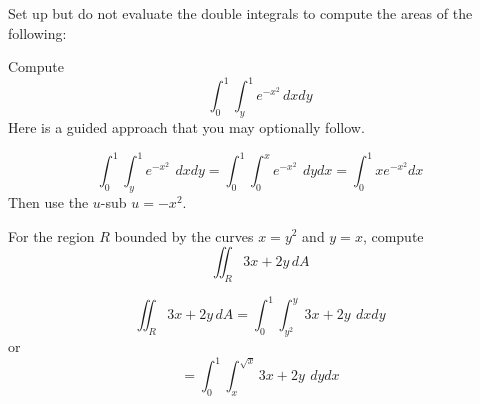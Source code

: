 \documentclass[addpoints]{exam}
\begin{document}
\printanswers
\begin{questions}
\question Set up but do not evaluate the double integrals to compute the areas of the following:
\question[20] Compute 
\[
\int_0^1 \int_y^1 e^{-x^2} \, dx dy
\]
Here is a guided approach that you may optionally follow.
\begin{solution}
\[
\int_0^1 \int_y^1 e^{-x^2} \, \ dx dy = \int_0^1 \int_0^x  e^{-x^2} \, \ dy dx = \int_0^1 x e^{-x^2} dx
\]
Then use the $u$-sub $u = -x^2$. 
\end{solution}
\question[20] For the region $R$ bounded by the curves $x = y^2$ and $y = x$, compute
\[
 \iint_R 3x + 2y \, dA
\]
\begin{solution}
\[
 \iint_R 3x + 2y \, dA = \int_0^1 \int_{y^2}^y 3x + 2y \, \ dx dy
\]
or
\[
= \int_0^1 \int_{x}^{\sqrt{x}} 3x + 2y \, \ dy dx
\]
\end{solution}
\end{questions}
\end{document}

